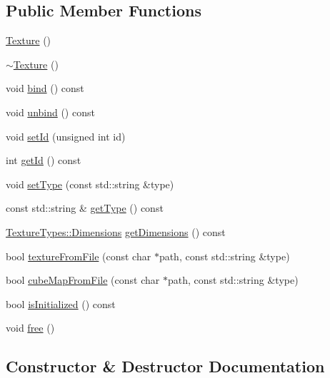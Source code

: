 \subsection*{Public Member Functions}
\begin{DoxyCompactItemize}
\item 
\mbox{\hyperlink{classec_1_1_texture_ac2551ef676d0c771f35dc470b8a0b237}{Texture}} ()
\item 
\mbox{\hyperlink{classec_1_1_texture_ae567d80654dd09c6b02a38ca8de29ead}{$\sim$\+Texture}} ()
\item 
void \mbox{\hyperlink{classec_1_1_texture_a9e2f0191cfcc85c87edb821508cc06ee}{bind}} () const
\item 
void \mbox{\hyperlink{classec_1_1_texture_a95c72abc5c801df231fc970c6adffdcc}{unbind}} () const
\item 
void \mbox{\hyperlink{classec_1_1_texture_af3555f8dda9a13babcb96d40d4417813}{set\+Id}} (unsigned int id)
\item 
int \mbox{\hyperlink{classec_1_1_texture_a0097b0b1826d7339ae109a187b6304d5}{get\+Id}} () const
\item 
void \mbox{\hyperlink{classec_1_1_texture_a4d984f43478753facd81186d1cd36bcb}{set\+Type}} (const std\+::string \&type)
\item 
const std\+::string \& \mbox{\hyperlink{classec_1_1_texture_a1c33bc610c0b5c7807fa92897320349f}{get\+Type}} () const
\item 
\mbox{\hyperlink{structec_1_1_texture_types_ac0e07f24452fa28dd8e6e33a224842fc}{Texture\+Types\+::\+Dimensions}} \mbox{\hyperlink{classec_1_1_texture_a5d1e6d8dd6c98ea036caf2696e47637a}{get\+Dimensions}} () const
\item 
bool \mbox{\hyperlink{classec_1_1_texture_ac2461a696b914d1b22192a87d326f480}{texture\+From\+File}} (const char $\ast$path, const std\+::string \&type)
\item 
bool \mbox{\hyperlink{classec_1_1_texture_ae84b0f18fa11275f09e4c8ea3dc89e02}{cube\+Map\+From\+File}} (const char $\ast$path, const std\+::string \&type)
\item 
bool \mbox{\hyperlink{classec_1_1_texture_ab81c62fde2f54dfbb5895a421224fcd9}{is\+Initialized}} () const
\item 
void \mbox{\hyperlink{classec_1_1_texture_a57242daae8cc1ea827848f9b7f7b7fbb}{free}} ()
\end{DoxyCompactItemize}


\subsection{Constructor \& Destructor Documentation}
\mbox{\label{classec_1_1_texture_ac2551ef676d0c771f35dc470b8a0b237}} 
